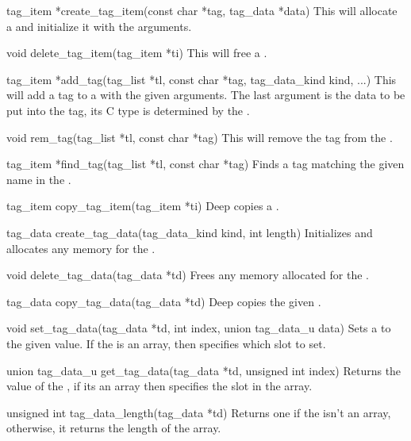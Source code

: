 \begin{cprototypelist}
  \item[tag_item *create_tag_item(const char *tag, tag_data
  *data)] This will allocate a  and initialize it with the
  arguments.

  \item[void delete_tag_item(tag_item *ti)] This will free a
  .

  \item[tag_item *add_tag(tag_list *tl, const char *tag,
  tag_data_kind kind, ...)] This will add a tag to a 
  with the given arguments.  The last argument is the data to be put into the
  tag, its C type is determined by the .

  \item[void rem_tag(tag_list *tl, const char *tag)] This will
  remove the tag from the .

  \item[tag_item *find_tag(tag_list *tl, const char *tag)] Finds
  a tag matching the given name in the .

  \item[tag_item copy_tag_item(tag_item *ti)] Deep copies a
  .

  \item[tag_data create_tag_data(tag_data_kind kind, int length)]
  Initializes and allocates any memory for the .

  \item[void delete_tag_data(tag_data *td)] Frees any memory
  allocated for the .

  \item[tag_data copy_tag_data(tag_data *td)] Deep copies the
  given .

  \item[void set_tag_data(tag_data *td, int index, union tag_data_u
  data)] Sets a  to the given value.  If the 
  is an array, then  specifies which slot to set.

  \item[union tag_data_u get_tag_data(tag_data *td, unsigned int
  index)] Returns the value of the , if its an array then
   specifies the slot in the array.

  \item[unsigned int tag_data_length(tag_data *td)] Returns one
  if the  isn't an array, otherwise, it returns the length of
  the array.


\end{cprototypelist}
